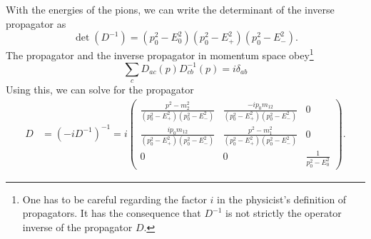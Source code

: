 With the energies of the pions, we can write the determinant of the inverse propagator as
%
\begin{equation}
    \det(D^{-1}) = (p_0^2 - E_0^2) (p_0^2 - E_+^2) (p_0^2 - E_-^2).
\end{equation}
%
The propagator and the inverse propagator in momentum space obey\footnote{One has to be careful regarding the factor $i$ in the physicist's definition of propagators. It has the consequence that $D^{-1}$ is not strictly the operator inverse of the propagator $D$.}
%
\begin{equation}
    \sum_c D_{ac}(p)D_{cb}^{-1}(p) = i \delta_{ab}
\end{equation}
%
Using this, we can solve for the propagator
%
\begin{align}
    D & = (- iD^{-1})^{-1} 
    \label{free pion propagator}
    = i
    \begin{pmatrix}
        \frac{
            p^2 - m_2^2
        }
        {
            (p_0^2 - E_+^2)(p_0^2 - E_-^2)
        } 
        & \frac{
            - ip_0m_{12}
        }
        {
            (p_0^2 - E_+^2)(p_0^2 - E_-^2)
        } & 0 \\
        \frac{
            ip_0m_{12}
        }
        {
            (p_0^2 - E_+^2)(p_0^2 - E_-^2)
        }
        & \frac{
            p^2 - m_1^2
        }
        {
            (p_0^2 - E_+^2)(p_0^2 - E_-^2)
        } & 0 \\
        0 & 0 & 
        \frac{1}{p_0^2 - E_0^2}
    \end{pmatrix}.
\end{align}



